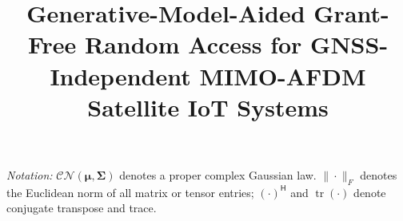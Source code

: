 \documentclass[10pt,journal,onecolumn]{IEEEtran}
\title{Generative-Model-Aided Grant-Free Random Access for GNSS-Independent MIMO-AFDM Satellite IoT Systems}
\author{}
\newcommand{\CN}{\mathcal{CN}}
\newcommand{\tr}{\operatorname{tr}}
\begin{document}
\maketitle



\noindent\textit{Notation:} $\CN(\bm\mu,\bm\Sigma)$ denotes a proper complex Gaussian law.
$\|\cdot\|_F$ denotes the Euclidean norm of all matrix or tensor entries;
$(\cdot)^{\mathsf H}$ and $\tr(\cdot)$ denote conjugate transpose and trace.





% 
% 

\appendices
{}




\end{document}
